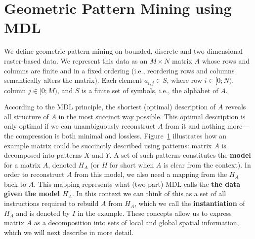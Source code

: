\documentclass{llncs}
\begin{document}
\section{Geometric Pattern Mining using MDL}



We define geometric pattern mining on bounded, discrete and two-dimensional raster-based data. We represent this data as an $M\times N$ matrix $A$ whose rows and columns are finite and in a fixed ordering (i.e., reordering rows and columns semantically alters the matrix). Each element $a_{i,j} \in S$, where row $i \in [0;N)$, column $j \in [0;M)$, and $S$ is a finite set of symbols, i.e., the alphabet of $A$. %

\begin{figure}[b]

\label{example1}
\end{figure}

According to the MDL principle, the shortest (optimal) description of $A$ reveals all structure of $A$ in the most succinct way possible. This optimal description is only optimal if we can unambiguously reconstruct $A$ from it and nothing more---the compression is both minimal and lossless. Figure~\ref{example1} illustrates how an example matrix could be succinctly described using patterns: matrix $A$ is decomposed into patterns $X$ and $Y$. A set of such patterns constitutes the \textbf{model} for a matrix $A$, denoted $H_A$ (or $H$ for short when $A$ is clear from the context). In order to reconstruct $A$ from this model, we also need a mapping from the $H_A$ back to $A$. This mapping represents what (two-part) MDL calls the \textbf{the data given the model $H_A$}. In this context we can think of this as a set of all instructions required to rebuild $A$ from $H_A$, which we call the \textbf{instantiation} of $H_A$ and is denoted by ${I}$ in the example. These concepts allow us to express matrix $A$ as a decomposition into sets of local and global spatial information, which we will next describe in more detail.
\end{document}
